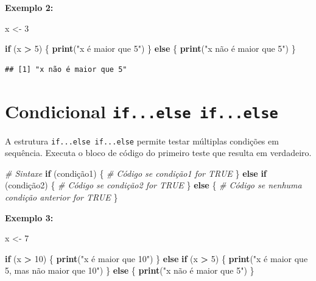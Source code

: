\documentclass[
]{book}
\newenvironment{Shaded}{\begin{snugshade}}{\end{snugshade}}
\newcommand{\CommentTok}[1]{\textcolor[rgb]{0.56,0.35,0.01}{\textit{#1}}}
\newcommand{\ControlFlowTok}[1]{\textcolor[rgb]{0.13,0.29,0.53}{\textbf{#1}}}
\newcommand{\DecValTok}[1]{\textcolor[rgb]{0.00,0.00,0.81}{#1}}
\newcommand{\FunctionTok}[1]{\textcolor[rgb]{0.13,0.29,0.53}{\textbf{#1}}}
\newcommand{\NormalTok}[1]{#1}
\newcommand{\OtherTok}[1]{\textcolor[rgb]{0.56,0.35,0.01}{#1}}
\newcommand{\SpecialCharTok}[1]{\textcolor[rgb]{0.81,0.36,0.00}{\textbf{#1}}}
\newcommand{\StringTok}[1]{\textcolor[rgb]{0.31,0.60,0.02}{#1}}
\begin{document}
\textbf{Exemplo 2:}

\begin{Shaded}
\begin{Highlighting}[]
\NormalTok{x }\OtherTok{\textless{}{-}} \DecValTok{3}

\ControlFlowTok{if}\NormalTok{ (x }\SpecialCharTok{\textgreater{}} \DecValTok{5}\NormalTok{) \{}
      \FunctionTok{print}\NormalTok{(}\StringTok{"x é maior que 5"}\NormalTok{)}
\NormalTok{\} }\ControlFlowTok{else}\NormalTok{ \{}
    \FunctionTok{print}\NormalTok{(}\StringTok{"x não é maior que 5"}\NormalTok{)}
\NormalTok{\}}
\end{Highlighting}
\end{Shaded}

\begin{verbatim}
## [1] "x não é maior que 5"
\end{verbatim}

\section{\texorpdfstring{Condicional \texttt{if...else\ if...else}}{Condicional if...else if...else}}\label{condicional-if...else-if...else}

A estrutura \texttt{if...else\ if...else} permite testar múltiplas condições em sequência. Executa o bloco de código do primeiro teste que resulta em verdadeiro.

\begin{Shaded}
\begin{Highlighting}[]
\CommentTok{\# Sintaxe}
\ControlFlowTok{if}\NormalTok{ (condição1) \{}
      \CommentTok{\# Código se condição1 for TRUE}
\NormalTok{\} }\ControlFlowTok{else} \ControlFlowTok{if}\NormalTok{ (condição2) \{}
      \CommentTok{\# Código se condição2 for TRUE}
\NormalTok{\} }\ControlFlowTok{else}\NormalTok{ \{}
      \CommentTok{\# Código se nenhuma condição anterior for TRUE}
\NormalTok{\}}
\end{Highlighting}
\end{Shaded}

\textbf{Exemplo 3:}

\begin{Shaded}
\begin{Highlighting}[]
\NormalTok{x }\OtherTok{\textless{}{-}} \DecValTok{7}

\ControlFlowTok{if}\NormalTok{ (x }\SpecialCharTok{\textgreater{}} \DecValTok{10}\NormalTok{) \{}
      \FunctionTok{print}\NormalTok{(}\StringTok{"x é maior que 10"}\NormalTok{)}
\NormalTok{\} }\ControlFlowTok{else} \ControlFlowTok{if}\NormalTok{ (x }\SpecialCharTok{\textgreater{}} \DecValTok{5}\NormalTok{) \{}
        \FunctionTok{print}\NormalTok{(}\StringTok{"x é maior que 5, mas não maior que 10"}\NormalTok{)}
\NormalTok{\} }\ControlFlowTok{else}\NormalTok{ \{}
        \FunctionTok{print}\NormalTok{(}\StringTok{"x não é maior que 5"}\NormalTok{)}
\NormalTok{\}}
\end{Highlighting}
\end{Shaded}
\end{document}

